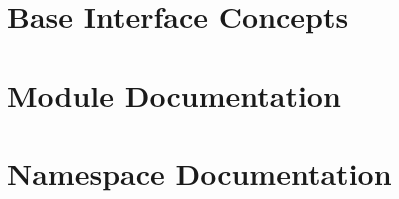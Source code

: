 \documentclass[letterpaper]{article}
\begin{document}
\section{Base Interface Concepts}
\label{interface_concepts}
\hypertarget{interface_concepts}{}

\clearemptydoublepage
\section{Module Documentation}




\clearemptydoublepage
\section{Namespace Documentation}




\clearemptydoublepage
\end{document}
